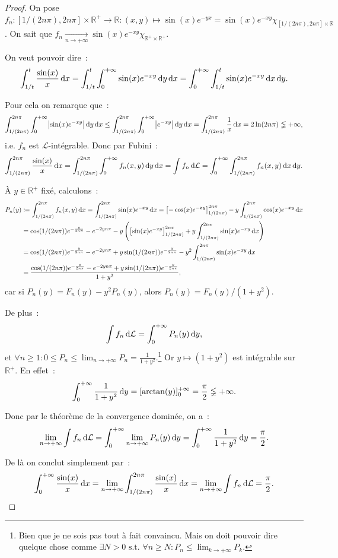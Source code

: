 \documentclass{article}
\newcommand{\pinfty}{{+\infty}}
\newcommand{\st}{\text{ s.t. }}
\newcommand{\R}{{\mathbb R}}
\begin{document}
\begin{proof} On pose $f_n : [1/(2n\pi), 2n\pi] \times \R^+ \to \R : (x, y) \mapsto \sin(x)e^{-yx} = \sin(x)e^{-xy}\chi_{[1/(2n\pi), 2n\pi] \times \R}$. On sait que
$f_n \xrightarrow[n \to \pinfty]{} \sin(x)e^{-xy}\chi_{\R^+ \times \R^+}$.

On veut pouvoir dire~:
\[\int_{1/t}^t\frac {\sin(x)}x\dif x = \int_{1/t}^t\int_0^\pinfty\sin(x)e^{-xy}\dif y\dif x = \int_0^\pinfty\int_{1/t}^t\sin(x)e^{-xy}\dif x\dif y.\]

Pour cela on remarque que~:
\[\int_{1/(2n\pi)}^{2n\pi}\int_0^\pinfty\abs {\sin(x)e^{-xy}}\dif y\dif x \leq \int_{1/(2n\pi)}^{2n\pi}\int_0^\pinfty\abs {e^{-xy}}\dif y\dif x
	= \int_{1/(2n\pi)}^{2n\pi}\frac 1x\dif x = 2\ln (2n\pi) \lneqq \pinfty,\]
i.e. $f_n$ est $\mathcal L$-intégrable. Donc par Fubini~:
\[\int_{1/(2n\pi)}^{2n\pi}\frac {\sin(x)}x\dif x = \int_{1/(2n\pi)}^{2n\pi}\int_0^\pinfty f_n(x, y)\dif y\dif x = \int f_n\dif\mathcal L
	= \int_0^\pinfty\int_{1/(2n\pi)}^{2n\pi}f_n(x, y)\dif x\dif y.\]

À $y \in \R^+$ fixé, calculons~:
\begin{align*}
	P_n(y) &\coloneqq \int_{1/(2n\pi)}^{2n\pi}f_n(x, y)\dif x = \int_{1/(2n\pi)}^{2n\pi}\sin(x)e^{-xy}\dif x = \left[-\cos(x)e^{-xy}\right]_{1/(2n\pi)}^{2n\pi} - y\int_{1/(2n\pi)}^{2n\pi}\cos(x)e^{-xy}\dif x \\
	&= \cos(1/(2n\pi))e^{-\frac y{2n\pi}} - e^{-2yn\pi} - y\left(\left[\sin(x)e^{-xy}\right]_{1/(2n\pi)}^{2n\pi} + y\int_{1/(2n\pi)}^{2n\pi}\sin(x)e^{-xy}\dif x\right) \\
	&= \cos(1/(2n\pi))e^{-\frac y{2n\pi}} - e^{-2yn\pi} + y\sin(1/(2n\pi))e^{-\frac y{2n\pi}} - y^2\int_{1/(2n\pi)}^{2n\pi}\sin(x)e^{-xy}\dif x \\
	&= \frac {\cos(1/(2n\pi))e^{-\frac y{2n\pi}} - e^{-2yn\pi} + y\sin(1/(2n\pi))e^{-\frac y{2n\pi}}}{1+y^2},
\end{align*}
car si $P_n(y) = F_n(y) - y^2P_n(y)$, alors $P_n(y) = F_n(y)/(1+y^2)$.

De plus~:
\[\int f_n\dif \mathcal L = \int_0^\pinfty P_n(y)\dif y,\]
et $\forall n \geq 1 : 0 \leq P_n \leq \lim_{n \to \pinfty}P_n = \frac 1{1+y^2}$.\footnote{Bien que je ne sois pas tout à fait convaincu. Mais on doit pouvoir dire quelque chose comme
$\exists N > 0 \st \forall n \geq N : P_n \leq \lim_{k \to \pinfty}P_k$.} Or $y \mapsto (1+y^2)$ est intégrable sur $\R^+$. En effet~:
\[\int_0^\pinfty\frac 1{1+y^2}\dif y = [\arctan(y)]_0^\pinfty = \frac \pi2 \lneqq \pinfty.\]

Donc par le théorème de la convergence dominée, on a~:
\[\lim_{n \to \pinfty}\int f_n\dif\mathcal L = \int_0^\pinfty \lim_{n \to \pinfty}P_n(y)\dif y = \int_0^\pinfty\frac 1{1+y^2}\dif y = \frac \pi2.\]

De là on conclut simplement par~:
\[\int_0^\pinfty \frac {\sin(x)}x\dif x = \lim_{n \to \pinfty}\int_{1/(2n\pi)}^{2n\pi}\frac {\sin(x)}x\dif x = \lim_{n \to \pinfty}\int f_n\dif\mathcal L = \frac \pi2.\]
{\small \color{white}{Voilà qui fut technique~!}}
\end{proof}
\end{document}
